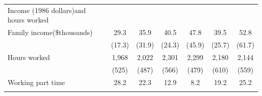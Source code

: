 \begin{center}
\begin{threeparttable}
\begin{tabular}{lcccccc}
Income (1986 dollars)and hours worked       &       &         &       &         &       &         \\
\hspace{.3in} Family income(\$thousands)    &29.3   &35.9     &40.5   &47.8     &39.5   &52.8     \\
                                            &(17.3) &(31.9)   &(24.3) &(45.9)   &(25.7) &(61.7)   \\[1ex]
\hspace{.3in} Hours worked                  &1,968  &2,022    &2,301  &2,299    &2,180  &2,144    \\
                                            &(525)  &(487)    &(566)  &(479)    &(610)  &(559)    \\
\hspace{.3in} Working part time             &28.2   & 22.3    &12.9   & 8.2     &19.2   & 25.2    \\ \\


\end{tabular}
\end{threeparttable}
\end{center}
